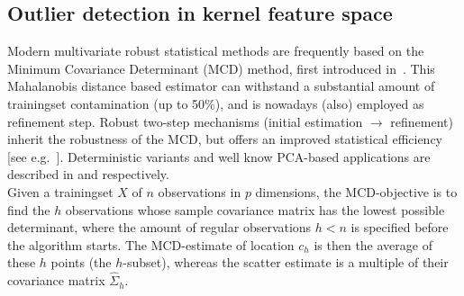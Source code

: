 \documentclass[preprint,12pt]{elsarticle}
\begin{document}
%	
	
	\subsection{Outlier detection in kernel feature space}
	 Modern multivariate robust statistical methods are frequently based on the Minimum Covariance Determinant (MCD) method, first introduced in~\cite{rousseeuw1985multivariate}. This Mahalanobis distance based estimator can withstand a substantial amount of trainingset contamination (up to 50\%), and is nowadays (also) employed as refinement step. Robust two-step mechanisms (initial estimation $\rightarrow$ refinement) inherit the robustness of the MCD, but offers an improved statistical efficiency [see e.g.~\cite{hubert2015dets}]. Deterministic variants and well know PCA-based applications are described in \cite{hubert2012deterministic} and \cite{hubert2005robpca} respectively. \\
	
	Given a trainingset $X$ of $n$ observations in $p$ dimensions, the MCD-objective is to find the $h$ observations whose sample covariance matrix has the lowest possible determinant, where the amount of regular observations $h < n$ is specified before the algorithm starts. The MCD-estimate of location $c_h$ is then the average of these $h$ points (the $h$-subset), whereas the scatter estimate is a multiple of their covariance matrix $\hat{\Sigma}_{h}$. 
	
\end{document}
